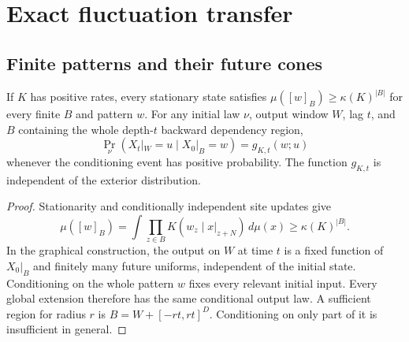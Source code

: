 \section{Exact fluctuation transfer}\label{sec:transfer}
\subsection{Finite patterns and their future cones}
\begin{lemma}
\label{lem:fluctuation}
If $K$ has positive rates, every stationary state satisfies
$\mu([w]_B)\geq\kappa(K)^{|B|}$ for every finite $B$ and pattern
$w$. For any initial law $\nu$, output window $W$, lag $t$, and
$B$ containing the whole depth-$t$ backward dependency region,
\begin{equation}\label{eq:conditional}
 \Pr_\nu(X_t|_W=u\mid X_0|_B=w)=g_{K,t}(w;u)
\end{equation}
whenever the conditioning event has positive probability. The
function $g_{K,t}$ is independent of the exterior distribution.
\end{lemma}
\begin{proof}
Stationarity and conditionally independent site updates give
\[
 \mu([w]_B)=
 \int\prod_{z\in B}K(w_z\mid x|_{z+N})\,d\mu(x)
 \geq\kappa(K)^{|B|}.
\]
In the graphical construction, the output on $W$ at time $t$
is a fixed function of $X_0|_B$ and finitely many future uniforms,
independent of the initial state. Conditioning on the whole
pattern $w$ fixes every relevant initial input. Every global
extension therefore has the same conditional output law.
A sufficient region for radius $r$ is $B=W+[-rt,rt]^D$.
Conditioning on only part of it is insufficient in general.
\end{proof}

